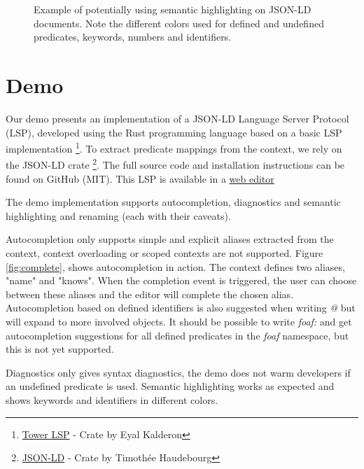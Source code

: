 \documentclass[
]{ceurart}
\begin{document}
\begin{figure}
\centering
{}
\caption{Example of potentially using semantic highlighting on JSON-LD documents. Note the different colors used for defined and undefined predicates, keywords, numbers and identifiers.}
\label{fig:semantic}
\end{figure}



\section{Demo}

Our demo presents an implementation of a JSON-LD Language Server Protocol (LSP), developed using the Rust programming language based on a basic LSP implementation \footnote{\href{https://crates.io/crates/tower-lsp}{Tower LSP} - Crate by Eyal Kalderon}.
To extract predicate mappings from the context, we rely on the JSON-LD crate \footnote{\href{https://crates.io/crates/json-ld}{JSON-LD} - Crate by Timothée Haudebourg}.
The full source code and installation instructions can be found on GitHub (MIT).
This LSP is available in a \href{https://jsonld.tiiny.site/}{web editor}

The demo implementation supports autocompletion, diagnostics and semantic highlighting and renaming (each with their caveats). 

Autocompletion only supports simple and explicit aliases extracted from the context, context overloading or scoped contexts are not supported. 
Figure \ref{fig:complete}, shows autocompletion in action.
The context defines two aliases, "name" and "knows". 
When the completion event is triggered, the user can choose between these aliases and the editor will complete the chosen alias.
Autocompletion based on defined identifiers is also suggested when writing \textit{@} but will expand to more involved objects.
It should be possible to write \textit{foaf:} and get autocompletion suggestions for all defined predicates in the \textit{foaf} namespace, but this is not yet supported.

Diagnostics only gives syntax diagnostics, the demo does not warm developers if an undefined predicate is used.
Semantic highlighting works as expected and shows keywords and identifiers in different colors.
\end{document}
